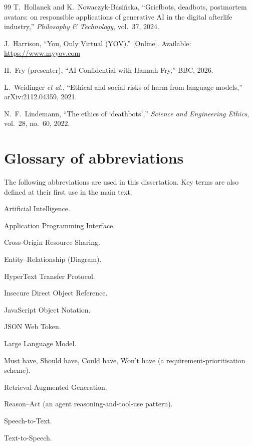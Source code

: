 \documentclass[11pt,a4paper]{report}
\begin{document}
\begin{thebibliography}{99}
 T.~Hollanek and K.~Nowaczyk-Basi\'nska, ``Griefbots, deadbots, postmortem avatars: on responsible applications of generative AI in the digital afterlife industry,'' \emph{Philosophy \& Technology}, vol.~37, 2024.

 J.~Harrison, ``You, Only Virtual (YOV).'' [Online]. Available: \url{https://www.myyov.com}

 H.~Fry (presenter), ``AI Confidential with Hannah Fry,'' BBC, 2026.

 L.~Weidinger \emph{et al.}, ``Ethical and social risks of harm from language models,'' arXiv:2112.04359, 2021.

 N.~F.~Lindemann, ``The ethics of `deathbots','' \emph{Science and Engineering Ethics}, vol.~28, no.~60, 2022.

\end{thebibliography}

\appendix

\chapter{Glossary of abbreviations}
\label{app:glossary}
The following abbreviations are used in this dissertation. Key terms are also defined at their first use in the main text.

\begin{description}[leftmargin=6.5em,style=nextline,itemsep=2pt]
  \item[AI] Artificial Intelligence.
  \item[API] Application Programming Interface.
  \item[CORS] Cross-Origin Resource Sharing.
  \item[ER / ERD] Entity--Relationship (Diagram).
  \item[HTTP] HyperText Transfer Protocol.
  \item[IDOR] Insecure Direct Object Reference.
  \item[JSON] JavaScript Object Notation.
  \item[JWT] JSON Web Token.
  \item[LLM] Large Language Model.
  \item[MoSCoW] Must have, Should have, Could have, Won't have (a requirement-prioritisation scheme).
  \item[RAG] Retrieval-Augmented Generation.
  \item[ReAct] Reason--Act (an agent reasoning-and-tool-use pattern).
  \item[STT] Speech-to-Text.
  \item[TTS] Text-to-Speech.
\end{description}
\end{document}
